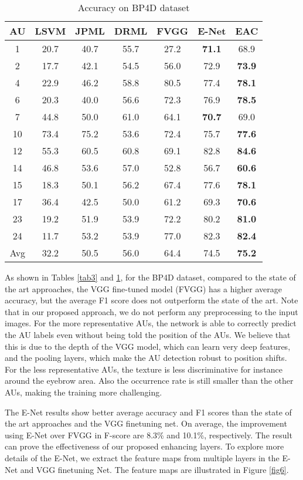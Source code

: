 \documentclass[a4paper, 10pt, conference]{ieeeconf}      %
\begin{document}
\begin{table}
\caption{Accuracy on BP4D dataset}
\label{tab4}
\begin{center}
\begin{tabular}{|c|c|c|c|c|c|c|}
\hline
AU& LSVM& JPML\cite{p13}& DRML\cite{p22}& FVGG& E-Net& EAC\\
\hline
1&20.7&40.7&55.7&27.2&{\bf 71.1}&68.9\\
2&17.7&42.1&54.5&56.0&72.9&{\bf 73.9}\\
4&22.9&46.2&58.8&80.5&77.4&{\bf 78.1}\\
6&20.3&40.0&56.6&72.3&76.9&{\bf 78.5}\\
7&44.8&50.0&61.0&64.1&{\bf 70.7}&69.0\\
10&73.4&	75.2&53.6&72.4&75.7&{\bf 77.6}\\
12&55.3&60.5&60.8&69.1&82.8&{\bf 84.6}\\
14&46.8&53.6&57.0&52.8&56.7&{\bf 60.6}\\
15&18.3&50.1&56.2&67.4&77.6&{\bf 78.1}\\
17&36.4&42.5&50.0&61.2&69.3&{\bf 70.6}\\
23&19.2&51.9&53.9&72.2&80.2&{\bf 81.0}\\
24&11.7&53.2&53.9&77.0&82.3&{\bf 82.4}\\
Avg&32.2&50.5&56.0&64.4&74.5&{\bf 75.2}\\

\hline
\end{tabular}
\end{center}
\end{table}


As shown in Tables \ref{tab3} and \ref{tab4}, for the BP4D dataset, compared to the state of the art approaches, the VGG fine-tuned model (FVGG) has a higher average accuracy, but the average F1 score does not outperform the state of the art. Note that in our proposed approach, we do not perform any preprocessing to the input images. For the more representative AUs, the network is able to correctly predict the AU labels even without being told the position of the AUs. We believe that this is due to the depth of the VGG model, which can learn very deep features, and the pooling layers, which make the AU detection robust to position shifts. For the less representative AUs, the texture is less discriminative for instance around the eyebrow area. Also the occurrence rate is still smaller than the other AUs, making the training more challenging.

The E-Net results show better average accuracy and F1 scores than the state of the art approaches and the VGG finetuning net.  On average, the improvement using E-Net over FVGG in F-score are 8.3\% and 10.1\%, respectively. The result can prove the effectiveness of our proposed enhancing layers. To explore more details of the E-Net, we extract the feature maps from multiple layers in the E-Net and VGG finetuning Net. The feature maps are illustrated in Figure \ref{fig6}.
\end{document}
